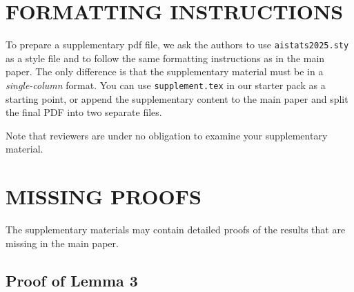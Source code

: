 \documentclass[twoside]{article}
\begin{document}
%

%

\onecolumn
{}


% 
% 



\section{FORMATTING INSTRUCTIONS}

To prepare a supplementary pdf file, we ask the authors to use \texttt{aistats2025.sty} as a style file and to follow the same formatting instructions as in the main paper.
The only difference is that the supplementary material must be in a \emph{single-column} format.
You can use \texttt{supplement.tex} in our starter pack as a starting point, or append the supplementary content to the main paper and split the final PDF into two separate files.

Note that reviewers are under no obligation to examine your supplementary material.

\section{MISSING PROOFS}

The supplementary materials may contain detailed proofs of the results that are missing in the main paper.

\subsection{Proof of Lemma 3}
\end{document}
